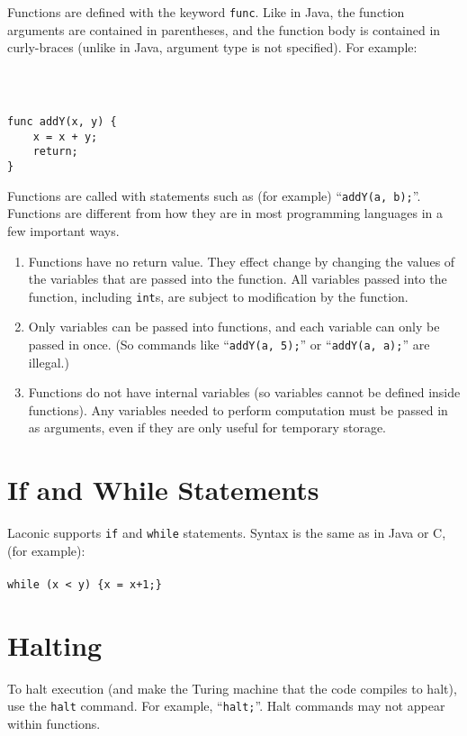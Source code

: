 \documentclass[11pt]{article}
\begin{document}
Functions are defined with the keyword \texttt{func}. Like in Java, the function arguments are contained in parentheses, and the function body is contained in curly-braces (unlike in Java, argument type is not specified). For example: \\ \\
{ \tt 
\begin{lstlisting}
func addY(x, y) {
    x = x + y;
    return;
}
\end{lstlisting}
}

Functions are called with statements such as (for example) ``\texttt{addY(a, b);}''. \\

Functions are different from how they are in most programming languages in a few important ways.
\begin{enumerate}
    \item Functions have no return value. They effect change by changing the values of the variables that are passed into the function. All variables passed into the function, including \texttt{int}s, are subject to modification by the function.
    \item Only variables can be passed into functions, and each variable can only be passed in once. (So commands like ``\texttt{addY(a, 5);}'' or ``\texttt{addY(a, a);}'' are illegal.)
    \item Functions do not have internal variables (so variables cannot be defined inside functions). Any variables needed to perform computation must be passed in as arguments, even if they are only useful for temporary storage. 
\end{enumerate}

\section{If and While Statements}

Laconic supports \texttt{if} and \texttt{while} statements. Syntax is the same as in Java or C, (for example): \\ \\
\texttt{while (x < y) \{x = x+1;\}}

\section{Halting}

To halt execution (and make the Turing machine that the code compiles to halt), use the \texttt{halt} command. For example, ``\texttt{halt;}''. Halt commands may not appear within functions.
\end{document}
